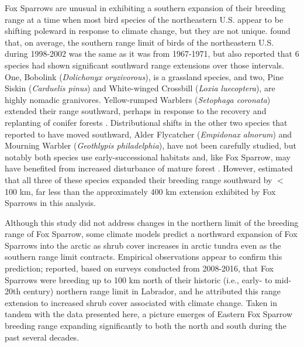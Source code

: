 \documentclass[fleqn,10pt,lineno]{wlpeerj} %
\begin{document}
Fox Sparrows are unusual in exhibiting a southern expansion of their breeding range at a time when most bird species of the northeastern U.S. appear to be shifting poleward in response to climate change, but they are not unique. \cite{hitch2007breeding} found that, on average, the southern range limit of birds of the northeastern U.S. during 1998-2002 was the same as it was from 1967-1971, but also reported that 6 species had shown significant southward range extensions over those intervals. One, Bobolink (\textit{Dolichonyx oryzivorous}), is a grassland species, and two, Pine Siskin (\textit{Carduelis pinus}) and White-winged Crossbill (\textit{Loxia luecoptera}), are highly nomadic granivores. Yellow-rumped Warblers (\textit{Setophaga coronata}) extended their range southward, perhaps in response to the recovery and replanting of conifer forests \citep{Hunt1998-px}. Distributional shifts in the other two species that \cite{hitch2007breeding} reported to have moved southward, Alder Flycatcher (\textit{Empidonax alnorum}) and Mourning Warbler (\textit{Geothlypis philadelphia}), have not been carefully studied, but notably both species use early-successional habitats and, like Fox Sparrow, may have benefited from increased disturbance of mature forest \citep{Pitocchelli2011-px,lowther1999-px}. However, \cite{hitch2007breeding} estimated that all three of these species expanded their breeding range southward by $<$ 100 km, far less than the approximately 400 km extension exhibited by Fox Sparrows in this analysis.

Although this study did not address changes in the northern limit of the breeding range of Fox Sparrow, some climate models predict a northward expansion of Fox Sparrows into the arctic as shrub cover increases in arctic tundra \citep{thompson2016winners} even as the southern range limit contracts. Empirical observations appear to confirm this prediction; \cite{whitaker2017expanded} reported, based on surveys conducted from 2008-2016, that Fox Sparrows were breeding up to 100 km north of their historic (i.e., early- to mid-20th century) northern range limit in Labrador, and he attributed this range extension to increased shrub cover associated with climate change. Taken in tandem with the data presented here, a picture emerges of Eastern Fox Sparrow breeding range expanding significantly to both the north and south during the past several decades.
\end{document}
